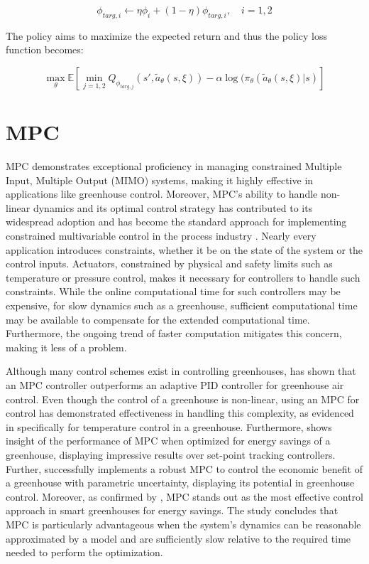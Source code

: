 \begin{equation}
	\phi_{targ,i} \leftarrow \eta \phi_{i} + (1-\eta)\phi_{targ,i}, \quad i = 1,2
\end{equation}


The policy aims to maximize the expected return and thus the policy loss function becomes:

\begin{equation}
	\max_{\theta} \mathbb{E} \left[\min_{j = 1,2} Q_{\phi_{targ,j}}(s', \tilde{a}_{\theta} (s, \xi)) - \alpha \log (\pi_\theta (\tilde{a}_{\theta} (s, \xi)| s)    \right]
\end{equation}


\section{MPC}\label{section:MPC}
MPC demonstrates exceptional proficiency in managing constrained Multiple Input, Multiple Output (MIMO) systems, making it highly effective in applications like greenhouse control. Moreover, MPC's ability to handle non-linear dynamics and its  optimal control strategy has contributed to its widespread adoption and has become the standard approach for implementing constrained multivariable control in the process industry \cite{daiDiscreteTimeModelPredictive2012}. Nearly every application introduces constraints, whether it be on the state of the system or the control inputs. Actuators, constrained by physical and safety limits such as temperature or pressure control, makes it necessary for controllers to handle such constraints. While the online computational time for such controllers may be expensive, for slow dynamics such as a greenhouse, sufficient computational time may be available to compensate for the extended computational time. Furthermore, the ongoing trend of faster computation mitigates this concern, making it less of a problem.

Although many control schemes exist in controlling greenhouses, \citet{ghoumariNonlinearConstrainedMPC2005} has shown that an MPC controller outperforms an adaptive PID controller for greenhouse air control. Even though the control of a greenhouse is non-linear, using an MPC for control has demonstrated effectiveness in handling this complexity, as evidenced in \cite{gruberNonlinearMPCBased2011, montoyaHybridcontrolledApproachMaintaining2016} specifically for temperature control in a greenhouse. Furthermore, \cite{bersaniModelPredictiveControl2020} shows insight of the performance of MPC when optimized for energy savings of a greenhouse, displaying impressive results over set-point tracking controllers. Further, \cite{boersmaRobustSamplebasedModel2022} successfully implements a robust MPC to control the economic benefit of a greenhouse with parametric uncertainty, displaying its potential in greenhouse control. Moreover, as confirmed by \cite{bersaniModelPredictiveControl2020}, MPC stands out as the most effective control approach in smart greenhouses for energy savings. The study concludes that MPC is particularly advantageous when the system's dynamics can be reasonable approximated by a model and are sufficiently slow relative to the required time needed to perform the optimization.

